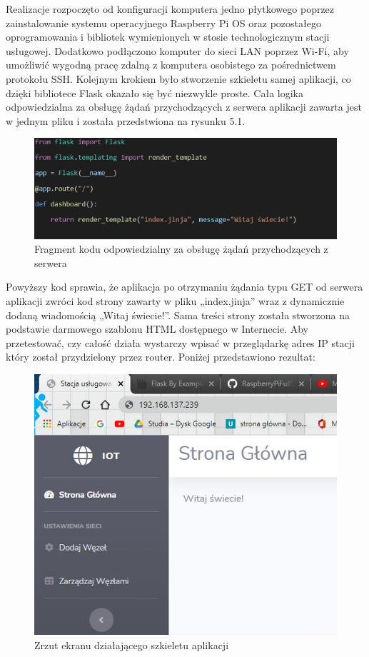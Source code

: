 \documentclass[12pt, twoside, openany]{mwrep}
\begin{document}
Realizacje rozpoczęto od konfiguracji komputera jedno płytkowego poprzez zainstalowanie systemu operacyjnego Raspberry Pi OS oraz pozostałego oprogramowania i bibliotek wymienionych w stosie technologicznym stacji usługowej. Dodatkowo podłączono komputer do sieci LAN poprzez Wi-Fi, aby umożliwić wygodną pracę zdalną z komputera osobistego za pośrednictwem protokołu SSH. Kolejnym krokiem było stworzenie szkieletu samej aplikacji, co dzięki bibliotece Flask okazało się być niezwykle proste. Cała logika odpowiedzialna za obsługę żądań przychodzących z serwera aplikacji zawarta jest w jednym pliku i została przedstwiona na rysunku 5.1.
\begin{figure}[H]
\centering
\includegraphics[scale=0.42]{kod}
\caption{Fragment kodu odpowiedzialny za obsługę żądań przychodzących z serwera}
\end{figure}
Powyższy kod sprawia, że aplikacja po otrzymaniu żądania typu GET od serwera aplikacji zwróci kod strony zawarty w pliku „index.jinja” wraz z dynamicznie dodaną wiadomością „Witaj świecie!”. Sama treści strony została stworzona na podstawie darmowego szablonu HTML dostępnego w Internecie.  Aby przetestować, czy całość działa wystarczy wpisać w przeglądarkę adres IP stacji który został przydzielony przez router. Poniżej przedstawiono rezultat:
\begin{figure}[H]
\centering
\includegraphics[scale=0.6]{szkielet}
\caption{Zrzut ekranu działającego szkieletu aplikacji}
\end{figure}
\end{document}
